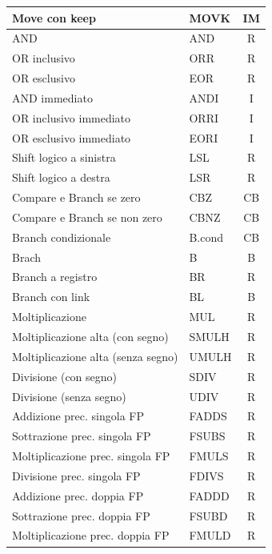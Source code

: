 \documentclass[12pt,a4paper]{article}
\begin{document}
\begin{longtable}{|l|l|c|}
Move con keep                      & MOVK   & IM \\ \hline
AND                                & AND    & R  \\ \hline
OR inclusivo                       & ORR    & R  \\ \hline
OR esclusivo                       & EOR    & R  \\ \hline
AND immediato                      & ANDI   & I  \\ \hline
OR inclusivo immediato             & ORRI   & I  \\ \hline
OR esclusivo immediato             & EORI   & I  \\ \hline
Shift logico a sinistra            & LSL    & R  \\ \hline
Shift logico a destra              & LSR    & R  \\ \hline
Compare e Branch se zero           & CBZ    & CB \\ \hline
Compare e Branch se non zero       & CBNZ   & CB \\ \hline
Branch condizionale                & B.cond & CB \\ \hline
Brach                              & B      & B  \\ \hline
Branch a registro                  & BR     & R  \\ \hline
Branch con link                    & BL     & B  \\ \hline
Moltiplicazione                    & MUL    & R  \\ \hline
Moltiplicazione alta (con segno)   & SMULH  & R  \\ \hline
Moltiplicazione alta (senza segno) & UMULH  & R  \\ \hline
Divisione (con segno)              & SDIV   & R  \\ \hline
Divisione (senza segno)            & UDIV   & R  \\ \hline
Addizione prec. singola FP         & FADDS  & R  \\ \hline
Sottrazione prec. singola FP       & FSUBS  & R  \\ \hline
Moltiplicazione prec. singola FP   & FMULS  & R  \\ \hline
Divisione prec. singola FP         & FDIVS  & R  \\ \hline
Addizione prec. doppia FP          & FADDD  & R  \\ \hline
Sottrazione prec. doppia FP        & FSUBD  & R  \\ \hline
Moltiplicazione prec. doppia FP    & FMULD  & R  \\ \hline

\end{longtable}
\end{document}
